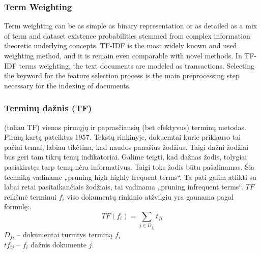 \documentclass{VUMIFInfKursinis}
\begin{document}
		\subsubsection{Term Weighting}
			Term weighting can be as simple as binary representation or as detailed as a mix of term and dataset existence probabilities stemmed from complex information theoretic underlying concepts. TF-IDF is the most widely known and used weighting method, and it is remain even comparable with novel methods. In TF-IDF terms weighting, the text documents are modeled as transactions.  Selecting the keyword for the feature selection process is the main preprocessing step necessary for the indexing of documents.

		\subsubsection{Terminų dažnis (TF)}
			 (toliau TF) vienas pirmųjų ir paprasčiausių (bet efektyvus) terminų metodas. Pirmą kartą pateiktas 1957\cite{luhn1957statistical}. Tekstų rinkinyje, dokuemtai kurie priklauso tai pačiai temai, labiau tikėtina, kad naudos panašius žodžius. Taigi dažni žodžiai bus geri tam tikrų temų indikatoriai. Galime teigti, kad dažnas žodis, tolygiai pasiskirstęs tarp temų nėra informativus. Taigi toks žodis būtu pašalinamas. Šia techniką vadiname „pruning high highly frequent terms“. Ta pati galim  atlikti su labai retai pasitaikančiais žodžiais, tai vadinama „pruning infrequent terms“.
			$TF$ reikšmė terminui $f_i$ viso dokumentų rinkinio atžvilgiu yra gaunama pagal formulę:.
			\begin{equation}
				TF(f_i)=\sum_{j\in D_{f_i}} t_{fi}
			\end{equation}
			$D_{fi}$ – dokumentai turintys terminą $f_i$\\ 
			$tf_{ij}$ – $f_i$ dažnis  dokumente $j$.
\end{document}
